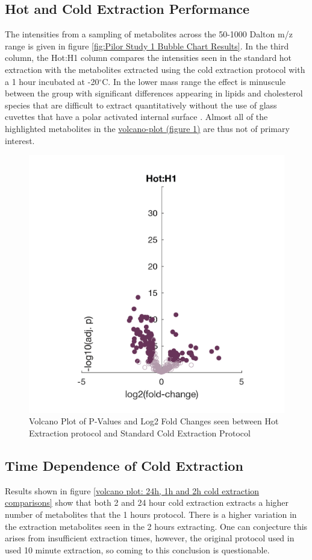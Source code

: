\documentclass[a4paper]{book}
\begin{document}
	\subsection*{Hot and Cold Extraction Performance}
	The intensities from a sampling of metabolites across the 50-1000 Dalton m/z range is given in figure \ref{fig:Pilor Study 1 Bubble Chart Results}. In the third column, the Hot:H1 column compares the intensities seen in the standard hot extraction with the metabolites extracted using the cold extraction protocol with a 1 hour incubated at -20$^\circ$C. In the lower mass range the effect is minuscule between the group with significant differences appearing in lipids and cholesterol species that are difficult to extract quantitatively without the use of glass cuvettes that have a polar activated internal surface \citep{Xia2010}. Almost all of the highlighted metabolites in the \hyperref[volcano plot: Hot_vs_Cold_H1]{volcano-plot (figure \ref{volcano plot: Hot_vs_Cold_H1})} are thus not of primary interest.

	\begin{figure}[ht]
		\centering
		\includegraphics[width=0.5\linewidth]{2.Optimizaiton_Figures/Hot_H1_01}
		\caption{Volcano Plot of P-Values and Log2 Fold Changes seen between Hot Extraction protocol and Standard Cold Extraction Protocol}
		\label{volcano plot: Hot_vs_Cold_H1}
	\end{figure}
	
	\subsection*{Time Dependence of Cold Extraction}
	Results shown in figure \ref{volcano plot: 24h, 1h and 2h cold extraction comparisons} show that  both 2 and 24 hour cold extraction extracts a higher number of metabolites that the 1 hours protocol. There is a higher variation in the extraction metabolites seen in the 2 hours extracting. One can conjecture this arises from insufficient extraction times, however, the original protocol used in \citep{Williams2016SystemsFunction} used 10 minute extraction, so coming to this conclusion is questionable. 
	
\end{document}
